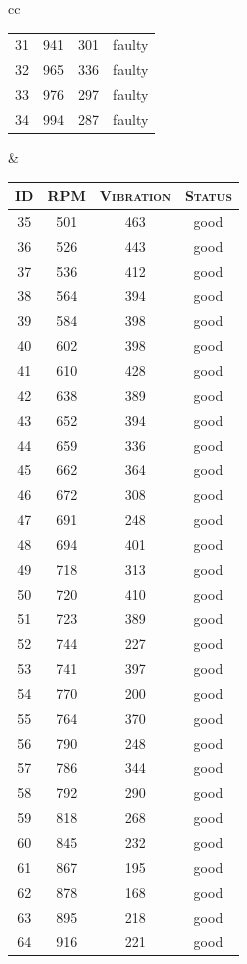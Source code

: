 \documentclass[xcolor={table}]{beamer}
\newcommand{\featN}[1]{\textsc{#1}}
\begin{document}
\begin{frame}[plain]
\begin{table}[!thb]
\begin{tiny}
{\begin{tabular}{cc}
\begin{minipage}{0.48\textwidth}
\begin{tabular}[ht]{ c c c c }
31	&	941	&	301	&	faulty	\\
32	&	965	&	336	&	faulty		\\
33	&	976	&	297	&	faulty	\\
34	&	994	&	287	&	faulty		\\
		\hline
					\end{tabular}
			\end{minipage}
			&
			\begin{minipage}{0.48\textwidth}
										\begin{tabular}[ht]{ c c c c }
\featN{ID} & \featN{RPM} & \featN{Vibration} & \featN{Status} \\
		\hline
35	&	501	&	463	&	good	\\
36	&	526	&	443	&	good	\\
37	&	536	&	412	&	good	\\
38	&	564	&	394	&	good	\\
39	&	584	&	398	&	good	\\
40	&	602	&	398	&	good	\\
41	&	610	&	428	&	good	\\
42	&	638	&	389	&	good	\\
43	&	652	&	394	&	good	\\
44	&	659	&	336	&	good	\\
45	&	662	&	364	&	good	\\
46	&	672	&	308	&	good	\\
47	&	691	&	248	&	good	\\
48	&	694	&	401	&	good	\\
49	&	718	&	313	&	good	\\
50	&	720	&	410	&	good	\\
51	&	723	&	389	&	good	\\
52	&	744	&	227	&	good	\\
53	&	741	&	397	&	good	\\
54	&	770	&	200	&	good	\\
55	&	764	&	370	&	good	\\
56	&	790	&	248	&	good	\\
57	&	786	&	344	&	good	\\
58	&	792	&	290	&	good	\\
59	&	818	&	268	&	good	\\
60	&	845	&	232	&	good	\\
61	&	867	&	195	&	good	\\
62	&	878	&	168	&	good	\\
63	&	895	&	218	&	good	\\
64	&	916	&	221	&	good	\\

\end{tabular}
\end{minipage}
\end{tabular}}
\end{tiny}
\end{table}
\end{frame}
\end{document}
